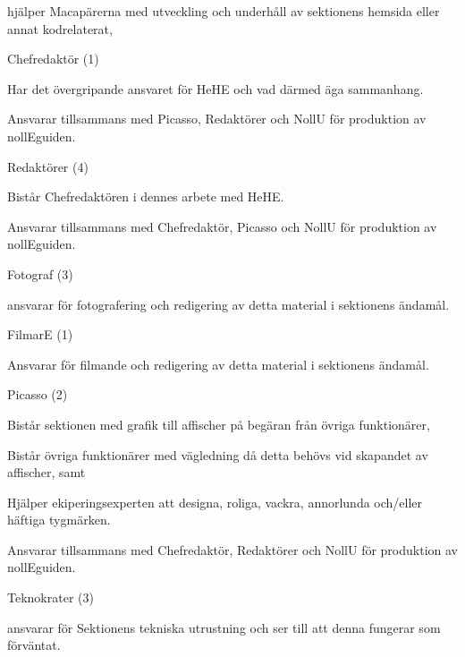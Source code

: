 \documentclass[10pt]{article}
\begin{document}
\begin{emptylist}
        \begin{dashlist}
            \item hjälper Macapärerna med utveckling och underhåll av
                sektionens hemsida eller annat kodrelaterat,
        \end{dashlist}
    \item Chefredaktör (1)
    		\begin{dashlist}
    			\item Har det övergripande ansvaret för HeHE och vad därmed äga sammanhang.
          \item Ansvarar tillsammans med Picasso, Redaktörer och NollU för produktion av nollEguiden.
    		\end{dashlist}
    	\item Redaktörer (4)
    		\begin{dashlist}
    			\item Bistår Chefredaktören i dennes arbete med HeHE.
          \item Ansvarar tillsammans med Chefredaktör, Picasso och NollU för produktion av nollEguiden.
    		\end{dashlist}
    \item Fotograf (3)
        \begin{dashlist}
            \item ansvarar för fotografering och redigering av detta material i sektionens ändamål.
        \end{dashlist}
    \item FilmarE (1)
        \begin{dashlist}
	\item Ansvarar för filmande och redigering av detta material i sektionens ändamål.
        \end{dashlist}
    \item Picasso (2)
		\begin{dashlist}
            \item Bistår sektionen med grafik till affischer på begäran från övriga funktionärer,
            \item Bistår övriga funktionärer med vägledning då detta behövs vid skapandet av affischer, samt
            \item Hjälper ekiperingsexperten att designa, roliga, vackra, annorlunda och/eller häftiga tygmärken.
            \item Ansvarar tillsammans med Chefredaktör, Redaktörer och NollU för produktion av nollEguiden.
        \end{dashlist}
    \item Teknokrater (3)
        \begin{dashlist}
            \item ansvarar för Sektionens tekniska utrustning och ser till att denna fungerar som förväntat.
        \end{dashlist}
\end{emptylist}
\end{document}
